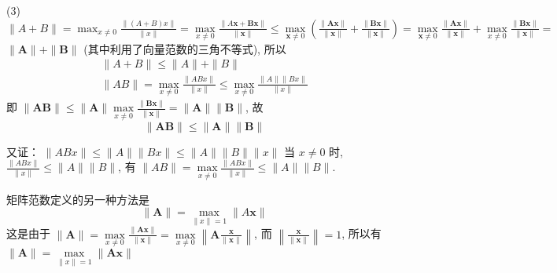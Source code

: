 (3) $ \|A+B\|=\max _{x \neq 0} \frac{\|(A+B) x\|}{\|x\|}=\max\limits _{x \neq 0} \frac{\|A \boldsymbol{x}+\boldsymbol{B} \boldsymbol{x}\|}{\|\boldsymbol{x}\|} \leqslant \max\limits _{\boldsymbol{x} \neq 0}\left(\frac{\|\boldsymbol{A} \boldsymbol{x}\|}{\|\boldsymbol{x}\|}+\frac{\|\boldsymbol{B} \boldsymbol{x}\|}{\|\boldsymbol{x}\|}\right)=\max \limits_{\boldsymbol{x} \neq 0} \frac{\|\boldsymbol{A} \boldsymbol{x}\|}{\|\boldsymbol{x}\|}+\max\limits _{x \neq 0} \frac{\|\boldsymbol{B} \boldsymbol{x}\|}{\|\boldsymbol{x}\|}= $ $ \|\boldsymbol{A}\|+\|\boldsymbol{B}\| $ (其中利用了向量范数的三角不等式), 所以
$$
\begin{array}{c}
\|A+B\| \leqslant\|A\|+\|B\| \\
\|A B\|=\max\limits _{x \neq 0} \frac{\|A B x\|}{\|x\|} \leqslant \max\limits _{x \neq 0} \frac{\|A\|\|B x\|}{\|x\|}
\end{array}
$$
即 $ \|\boldsymbol{A B}\| \leqslant\|\boldsymbol{A}\| \max\limits _{x \neq 0} \frac{\|\boldsymbol{B} \boldsymbol{x}\|}{\|\boldsymbol{x}\|}=\|\boldsymbol{A}\|\|\boldsymbol{B}\| $, 故
$$
\|\boldsymbol{A B}\| \leqslant\|\boldsymbol{A}\|\|\boldsymbol{B}\|
$$

又证： $ \|A B x\| \leqslant\|A\|\|B x\| \leqslant\|A\|\|B\|\|x\| $
当 $ x \neq 0 $ 时, $ \frac{\|A B x\|}{\|x\|} \leqslant\|A\|\|B\| $, 有 $ \|A B\|=\max\limits _{x \neq 0} \frac{\|A B x\|}{\|x\|} \leqslant\|A\|\|B\| $.


矩阵范数定义的另一种方法是
$$\boxed{
\|\boldsymbol{A}\|=\max _{\|x\|=1}\|A \boldsymbol{x}\|}
$$
这是由于 $ \|\boldsymbol{A}\|=\max\limits _{x \neq 0} \frac{\|\boldsymbol{A} \boldsymbol{x}\|}{\|\boldsymbol{x}\|}=\max\limits _{x \neq 0}\left\|\boldsymbol{A} \frac{\boldsymbol{x}}{\|\boldsymbol{x}\|}\right\| $, 而 $ \left\|\frac{\boldsymbol{x}}{\|\boldsymbol{x}\|}\right\|=1 $, 所以有 $ \|\boldsymbol{A}\|=\max \limits_{\|x\|=1}\|\boldsymbol{A} \boldsymbol{x}\|$

